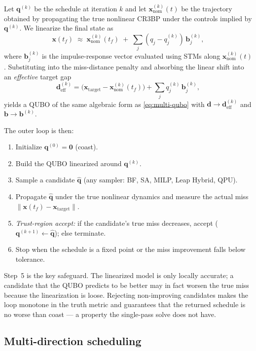 \documentclass[8pt,a4paper]{article}
\newcommand{\bvec}[1]{\bm{#1}}
\theoremstyle{definition}
\theoremstyle{remark}
\begin{document}
Let $\bvec q^{(k)}$ be the schedule at iteration $k$ and let
$\bvec x^{(k)}_{\mathrm{nom}}(t)$ be the trajectory obtained by
propagating the true nonlinear CR3BP under the controls implied by
$\bvec q^{(k)}$.  We linearize the final state as
\begin{equation}\label{eq:lin-around-q}
  \bvec x(t_f) \;\approx\; \bvec x^{(k)}_{\mathrm{nom}}(t_f)
  \;+\; \sum_j (q_j - q^{(k)}_j)\, \bvec b^{(k)}_j,
\end{equation}
where $\bvec b^{(k)}_j$ is the impulse-response vector evaluated using
STMs along $\bvec x^{(k)}_{\mathrm{nom}}(t)$.  Substituting into the
miss-distance penalty and absorbing the linear shift into an
\emph{effective} target gap
\[
  \bvec d_{\mathrm{eff}}^{(k)}
  = \big(\bvec x_{\mathrm{target}} - \bvec x^{(k)}_{\mathrm{nom}}(t_f)\big)
  + \sum_j q^{(k)}_j\, \bvec b^{(k)}_j ,
\]
yields a QUBO of the same algebraic form as
\eqref{eq:multi-qubo} with $\bvec d \to \bvec d_{\mathrm{eff}}^{(k)}$
and $\bvec b \to \bvec b^{(k)}$.

The outer loop is then:
\begin{enumerate}[leftmargin=1.5em, itemsep=1pt]
  \item Initialize $\bvec q^{(0)} = \bvec 0$ (coast).
  \item Build the QUBO linearized around $\bvec q^{(k)}$.
  \item Sample a candidate $\hat{\bvec q}$ (any sampler: BF, SA, MILP,
    Leap Hybrid, QPU).
  \item Propagate $\hat{\bvec q}$ under the true nonlinear dynamics
    and measure the actual miss
    $\|\bvec x(t_f) - \bvec x_{\mathrm{target}}\|$.
  \item \emph{Trust-region accept:} if the candidate's true miss
    decreases, accept ($\bvec q^{(k+1)} \leftarrow \hat{\bvec q}$);
    else terminate.
  \item Stop when the schedule is a fixed point or the miss
    improvement falls below tolerance.
\end{enumerate}

Step~5 is the key safeguard.  The linearized model is only locally
accurate; a candidate that the QUBO predicts to be better may in fact
worsen the true miss because the linearization is loose.  Rejecting
non-improving candidates makes the loop monotone in the truth metric
and guarantees that the returned schedule is no worse than coast — a
property the single-pass solve does not have.

\subsection{Multi-direction scheduling}\label{sec:multi-direction}
\end{document}
